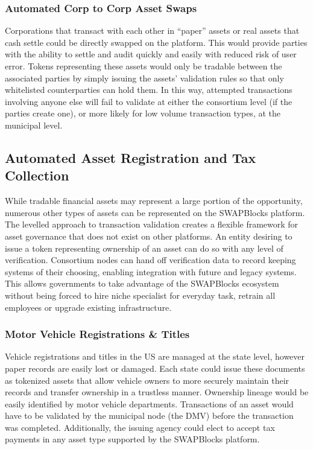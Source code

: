 \documentclass[12pt]{article}
\begin{document}
\subsubsection{Automated Corp to Corp Asset Swaps}
Corporations that transact with each other in “paper” assets or real assets that cash settle could be directly 
swapped on the platform. This would provide parties with the ability to settle and audit quickly and easily with 
reduced risk of user error. Tokens representing these assets would only be tradable between the associated parties 
by simply issuing the assets' validation rules so that only whitelisted counterparties can hold them. In this way, 
attempted transactions involving anyone else will fail to validate at either the consortium level (if the parties 
create one), or more likely for low volume transaction types, at the municipal level.

\subsection{Automated Asset Registration and Tax Collection}

While tradable financial assets may represent a large portion of the opportunity, numerous other types of assets can be represented on the 
SWAPBlocks platform. The levelled approach to transaction validation creates a flexible framework for asset governance that does not exist 
on other platforms. An entity desiring to issue a token representing ownership of an asset can do so with any level of verification. 
Consortium nodes can hand off verification data to record keeping systems of their choosing, enabling integration with future and legacy 
systems.  This allows governments to take advantage of the SWAPBlocks ecosystem without being forced to hire niche specialist for everyday 
task, retrain all employees or upgrade existing infrastructure.

\subsubsection{Motor Vehicle Registrations \& Titles}
Vehicle registrations and titles in the US are managed at the state level, however paper records are easily lost or damaged. Each state could issue these documents as tokenized assets that allow vehicle owners to more securely maintain their records and transfer ownership in a trustless manner. Ownership lineage would be easily identified by motor vehicle departments. Transactions of an asset would have to be validated by the municipal node (the DMV) before the transaction was completed. Additionally, the issuing agency could elect to accept tax payments in any asset type supported by the SWAPBlocks platform.
\end{document}
